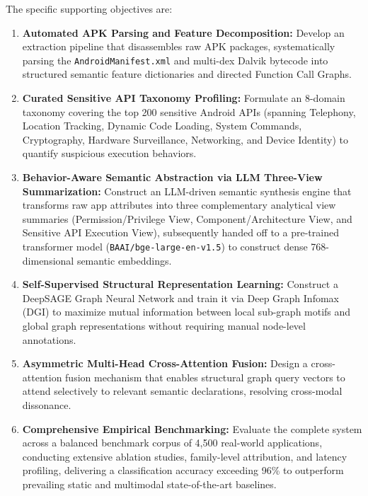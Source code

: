 \documentclass[12pt,a4paper,oneside]{report}
\begin{document}
The specific supporting objectives are:
\begin{enumerate}
    \item \textbf{Automated APK Parsing and Feature Decomposition:} Develop an extraction pipeline that disassembles raw APK packages, systematically parsing the \texttt{AndroidManifest.xml} and multi-dex Dalvik bytecode into structured semantic feature dictionaries and directed Function Call Graphs.
    \item \textbf{Curated Sensitive API Taxonomy Profiling:} Formulate an 8-domain taxonomy covering the top 200 sensitive Android APIs (spanning Telephony, Location Tracking, Dynamic Code Loading, System Commands, Cryptography, Hardware Surveillance, Networking, and Device Identity) to quantify suspicious execution behaviors.
    \item \textbf{Behavior-Aware Semantic Abstraction via LLM Three-View Summarization:} Construct an LLM-driven semantic synthesis engine that transforms raw app attributes into three complementary analytical view summaries (Permission/Privilege View, Component/Architecture View, and Sensitive API Execution View), subsequently handed off to a pre-trained transformer model (\texttt{BAAI/bge-large-en-v1.5}) to construct dense 768-dimensional semantic embeddings.
    \item \textbf{Self-Supervised Structural Representation Learning:} Construct a DeepSAGE Graph Neural Network and train it via Deep Graph Infomax (DGI) to maximize mutual information between local sub-graph motifs and global graph representations without requiring manual node-level annotations.
    \item \textbf{Asymmetric Multi-Head Cross-Attention Fusion:} Design a cross-attention fusion mechanism that enables structural graph query vectors to attend selectively to relevant semantic declarations, resolving cross-modal dissonance.
    \item \textbf{Comprehensive Empirical Benchmarking:} Evaluate the complete system across a balanced benchmark corpus of 4,500 real-world applications, conducting extensive ablation studies, family-level attribution, and latency profiling, delivering a classification accuracy exceeding 96\% to outperform prevailing static and multimodal state-of-the-art baselines.
\end{enumerate}
\end{document}
